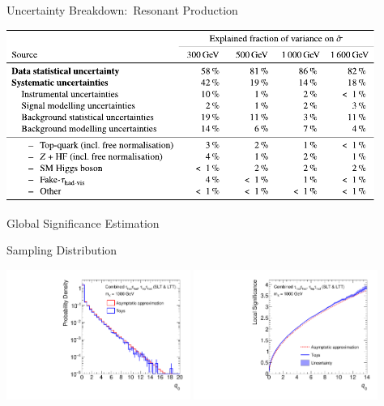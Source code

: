 \documentclass[11pt, xcolor={dvipsnames}, aspectratio=169]{beamer}
\begin{document}

\begin{frame}{Uncertainty Breakdown:\ Resonant  Production}
  \centering

  \includegraphics[width=0.9\textwidth]{backup/uncertainty_breakdown_resonant}
\end{frame}


\begin{frame}[standout]
  Global Significance Estimation
\end{frame}


\begin{frame}{ Sampling Distribution}
  \centering

  \includegraphics[width=0.45\textwidth]{global_significance/local_sig_toys/q0_1000}\hfill%
  \includegraphics[width=0.45\textwidth]{global_significance/local_sig_toys/q0sig_1000}
\end{frame}
\end{document}
